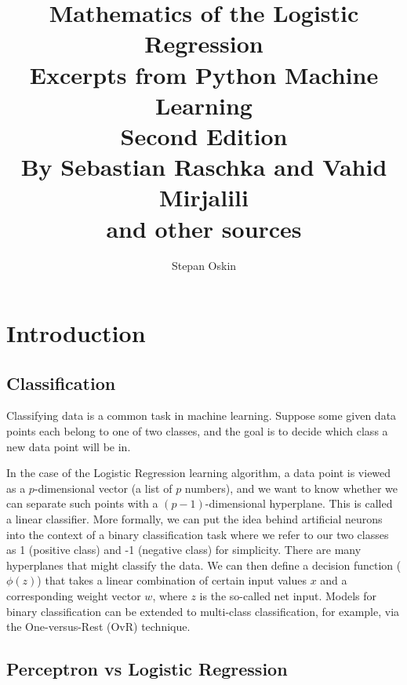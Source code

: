 \documentclass[11pt]{article}
\begin{document}
    \title{Mathematics of the Logistic Regression \\
    Excerpts from Python Machine Learning \\
    Second Edition \\
    By Sebastian Raschka and Vahid Mirjalili\cite{RaschkaMirjalili2017} \\
    and other sources}

    \author{Stepan Oskin}

    \maketitle

    \begin{abstract}


    \end{abstract}

    \section{Introduction} \label{sec:ada_intro}

    \subsection{Classification} \label{subsec:classification}

    Classifying data is a common task in machine learning.
    Suppose some given data points each belong to one of two classes, and the goal is to decide which class a
    new data point will be in.

    In the case of the Logistic Regression learning algorithm, a data point is viewed as a $p$-dimensional vector
    (a list of $p$ numbers), and we want to know whether we can separate such points with a $(p-1)$-dimensional hyperplane.
    This is called a linear classifier.
    More formally, we can put the idea behind artificial neurons into the context of a binary classification task where we refer to our two classes as 1 (positive class) and -1 (negative class) for simplicity.
    There are many hyperplanes that might classify the data.
    We can then define a decision function ($\phi(z)$) that takes a linear combination of certain input values $x$ and a corresponding weight vector $w$, where $z$ is the so-called net input.
    Models for binary classification can be extended to multi-class classification, for example, via the One-versus-Rest (OvR) technique.

    \subsection{Perceptron vs Logistic Regression} \label{subsec:lr_intro}
\end{document}
